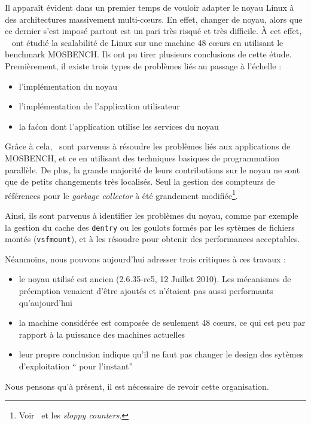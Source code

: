       Il apparaît évident dans un premier temps de vouloir adapter le noyau
      Linux à des architectures massivement multi-c\oe urs. En effet, changer de
      noyau, alors que ce dernier s’est imposé partout est un pari très risqué
      et très difficile. À cet effet, ~\citet{boyd2010analysis} ont étudié la
      scalabilité de Linux sur une machine 48 c\oe urs en utilisant le benchmark
      MOSBENCH. Ils ont pu tirer plusieurs conclusions de cette étude.
      Premièrement, il existe trois types de problèmes liés au passage à
      l’échelle :
      \begin{itemize}
        \item l’implémentation du noyau
        \item l’implémentation de l’application utilisateur
        \item la faćon dont l’application utilise les services du noyau
      \end{itemize}
      Grâce à cela,~\citeauthor{boyd2010analysis} sont parvenus à résoudre les
      problèmes liés aux applications de MOSBENCH, et ce en utilisant des
      techniques basiques de programmation parallèle. De plus, la grande
      majorité de leurs contributions sur le noyau ne sont que de petits
      changements très localisés. Seul la gestion des compteurs de références
      pour le \textit{garbage collector} à été grandement
      modifiée\footnote{Voir~\citep{boyd2010analysis} et les \textit{sloppy
          counters}.}.

      Ainsi, ils sont parvenus à identifier les problèmes du noyau, comme par
      exemple la gestion du cache des \texttt{dentry} ou les goulots formés par
      les sytèmes de fichiers montés (\texttt{vsfmount}), et à les résoudre pour
      obtenir des performances acceptables.

      Néanmoins, nous pouvons aujourd’hui adresser trois critiques à ces travaux
      :
      \begin{itemize}
        \item le noyau utilisé est ancien (2.6.35-rc5, 12 Juillet 2010). Les
          mécanismes de préemption venaient d’être ajoutés et n’étaient pas
          aussi performants qu'aujourd'hui
        \item la machine considérée est composée de seulement 48 c\oe urs, ce qui
          est peu par rapport à la puissance des machines actuelles
        \item leur propre conclusion indique qu’il ne faut pas changer le design
          des sytèmes d’exploitation `` pour l’instant''\\
      \end{itemize}
      Nous pensons qu’à présent, il est nécessaire de revoir cette organisation.

